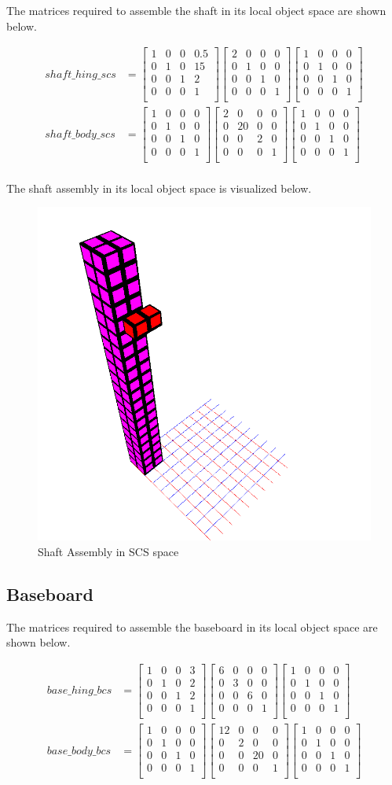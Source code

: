 \documentclass[12pt]{article}
\newcommand{\scale}[3]{
    \begin{bmatrix}
        #1 & 0 & 0 & 0 \\
        0 & #2 & 0 & 0 \\
        0 & 0 & #3 & 0 \\
        0 & 0 & 0 & 1 \\
    \end{bmatrix}
}
\newcommand{\identity}{
    \begin{bmatrix}
        1 & 0 & 0 & 0 \\
        0 & 1 & 0 & 0 \\
        0 & 0 & 1 & 0 \\
        0 & 0 & 0 & 1 \\
    \end{bmatrix}
}
\newcommand{\trans}[3]{
    \begin{bmatrix}
        1 & 0 & 0 & #1 \\
        0 & 1 & 0 & #2 \\
        0 & 0 & 1 & #3 \\
        0 & 0 & 0 & 1 \\
    \end{bmatrix}
}
\newcommand{\mattext}[1]{
    The matrices required to assemble the #1 in its local object space are shown below.
}
\newcommand{\imgtext}[1]{
    The #1 assembly in its local object space is visualized below.
}
\begin{document}
        \mattext{shaft}
        $$
        \begin{aligned}
            shaft\_hing\_scs  &=  \trans{0.5}{15}{2} \scale{2}{1}{1} \identity \\
            shaft\_body\_scs  &=  \trans{0}{0}{0} \scale{2}{20}{2} \identity \\
        \end{aligned}
        $$

        \imgtext{shaft}
        \begin{figure}[H]
            \centering
            \includegraphics[width=0.75\linewidth]{../images/shaft.png}
            \caption{Shaft Assembly in SCS space}
        \end{figure}

    \newpage
    \subsection*{Baseboard}

        \mattext{baseboard}
        $$
        \begin{aligned}
            base\_hing\_bcs   &=  \trans{3}{2}{2} \scale{6}{3}{6} \identity \\
            base\_body\_bcs   &=  \trans{0}{0}{0} \scale{12}{2}{20} \identity \\
        \end{aligned}
        $$
\end{document}

